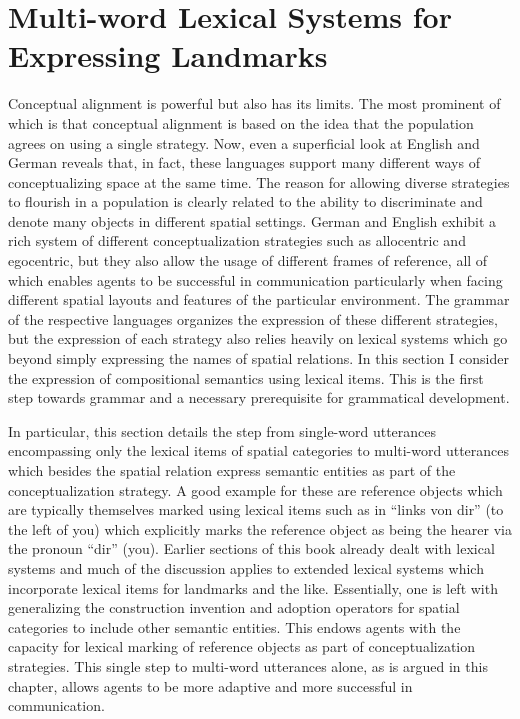 % 

\chapter{Multi-word Lexical Systems for Expressing Landmarks}
\label{s:multi-word}
Conceptual alignment is powerful but also has its limits. The most prominent of which
is that conceptual alignment is based on the idea that the population agrees on using a 
single strategy. Now, even a superficial look at English and German reveals that, in fact, 
these languages support many different ways of conceptualizing space at the same time. 
The reason for allowing diverse strategies to flourish in a population is clearly related to 
the ability to discriminate and denote many objects in different spatial settings.
German and English exhibit a rich system of different conceptualization
strategies such as allocentric and egocentric, but they also allow the usage of different frames of reference,
all of which enables agents to be successful in communication particularly when facing different spatial layouts 
and features of the particular environment. The grammar of the respective languages organizes
the expression of these different strategies, but the expression of each strategy also relies heavily on 
lexical systems which go beyond simply expressing the names of spatial relations. 
In this section I consider the expression of compositional semantics using lexical items. 
This is the first step towards grammar and a necessary prerequisite for grammatical development. 

In particular, this section details the step from single-word utterances encompassing only the lexical 
items of spatial categories to multi-word utterances which besides the spatial relation express 
semantic entities as part of the conceptualization strategy. A good example for these are
reference objects which are typically themselves marked using lexical items such as 
in ``links von dir'' (to the left of you) which explicitly marks the reference object as being
the hearer via the pronoun ``dir'' (you). Earlier sections of this book already 
dealt with lexical systems and much of the discussion applies to extended lexical systems which 
incorporate lexical items for landmarks and the like. Essentially, one is 
left with generalizing the construction invention and adoption operators for spatial 
categories to include other semantic entities. This endows agents with the capacity for lexical marking 
of reference objects as part of conceptualization strategies. This single step to 
multi-word utterances alone, as is argued in this chapter, allows agents to be 
more adaptive and more successful in communication.

